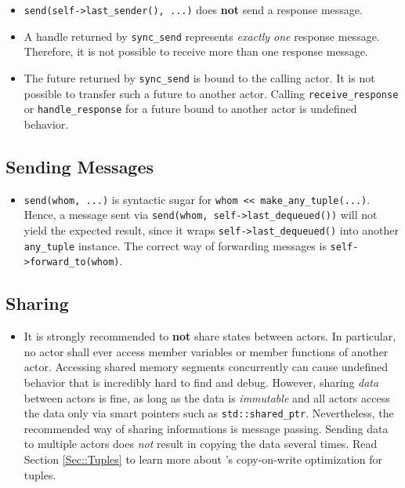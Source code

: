 \begin{itemize}

\item
\lstinline^send(self->last_sender(), ...)^ does \textbf{not} send a response message.

\item
A handle returned by \lstinline^sync_send^ represents \emph{exactly one} response message.
Therefore, it is not possible to receive more than one response message.

\item
The future returned by \lstinline^sync_send^ is bound to the calling actor.
It is not possible to transfer such a future to another actor.
Calling \lstinline^receive_response^ or \lstinline^handle_response^ for a future bound to another actor is undefined behavior.

\end{itemize}

\subsection{Sending Messages}

\begin{itemize}

\item
\lstinline^send(whom, ...)^ is syntactic sugar for \lstinline^whom << make_any_tuple(...)^.
Hence, a message sent via \lstinline^send(whom, self->last_dequeued())^ will not yield the expected result, since it wraps \lstinline^self->last_dequeued()^ into another \lstinline^any_tuple^ instance.
The correct way of forwarding messages is \lstinline^self->forward_to(whom)^.

\end{itemize}

\clearpage

\subsection{Sharing}

\begin{itemize}
\item It is strongly recommended to \textbf{not} share states between actors.
In particular, no actor shall ever access member variables or member functions of another actor.
Accessing shared memory segments concurrently can cause undefined behavior that is incredibly hard to find and debug.
However, sharing \textit{data} between actors is fine, as long as the data is \textit{immutable} and all actors access the data only via smart pointers such as \lstinline^std::shared_ptr^.
Nevertheless, the recommended way of sharing informations is message passing.
Sending data to multiple actors does \textit{not} result in copying the data several times.
Read Section \ref{Sec::Tuples} to learn more about \libcppa's copy-on-write optimization for tuples.
\end{itemize}

